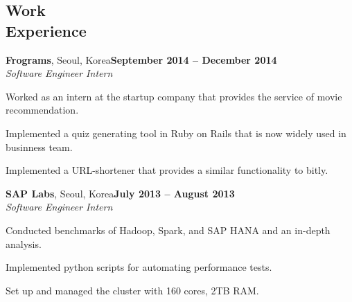 \documentclass[10pt,margin,line]{cv}
\begin{document}
\begin{resume}
    \section{\mysidestyle Work\\Experience}
    \textbf{Frograms}, Seoul, Korea\hfill \textbf{September 2014 -- December 2014} \vspace{1mm}\\\vspace{0mm}%
    \textsl{Software Engineer Intern}
    \vspace{-2mm}\\\vspace{-1mm}%
    \begin{list3}
        \item Worked as an intern at the startup company that provides the service of movie recommendation.
        \item Implemented a quiz generating tool in Ruby on Rails that is now widely used in businness team.
        \item Implemented a URL-shortener that provides a similar functionality to bitly.
    \end{list3}

    \textbf{SAP Labs}, Seoul, Korea\hfill \textbf{July 2013 -- August 2013} \vspace{1mm}\\\vspace{0mm}%
    \textsl{Software Engineer Intern}
    \vspace{-2mm}\\\vspace{-1mm}%
    \begin{list3}
        \item Conducted benchmarks of Hadoop, Spark, and SAP HANA and an in-depth analysis.
        \item Implemented python scripts for automating performance tests.
        \item Set up and managed the cluster with 160 cores, 2TB RAM.
  \end{list3}



\end{resume}
\end{document}
